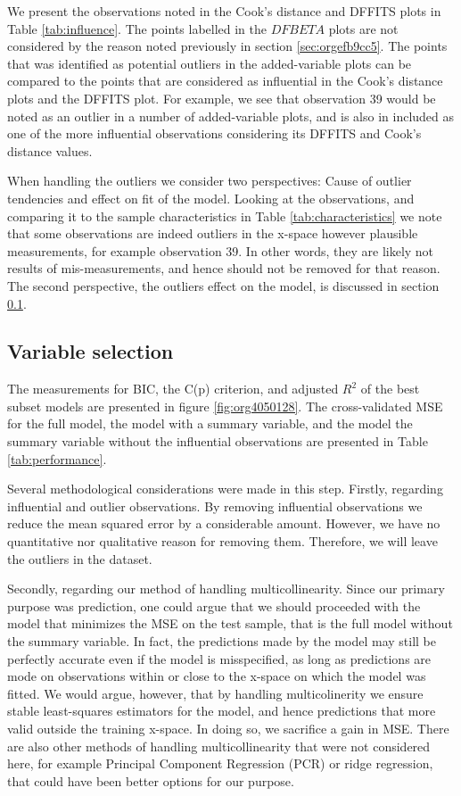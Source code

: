 \documentclass[11pt]{article}
\begin{document}
We present the observations noted in the Cook's distance and DFFITS plots in Table \ref{tab:influence}.
The points labelled in the \(DFBETA\) plots are not considered by the reason noted previously 
in section \ref{sec:orgefb9cc5}. The points that was identified as potential outliers in the added-variable
plots can be compared to the points that are considered as influential in the Cook's distance plots
and the DFFITS plot. For example, we see that observation 39 would be noted as an outlier in a number of 
added-variable plots, and is also in included as one of the more influential observations considering 
its DFFITS and Cook's distance values.

When handling the outliers we consider two perspectives: Cause of outlier tendencies and effect on fit of 
the model. Looking at the observations, and comparing it to the sample characteristics in Table \ref{tab:characteristics}
we note that some observations are indeed outliers in the x-space however 
plausible measurements, for example observation 39. In other words, they are likely not results
of mis-measurements, and hence should not be removed for that reason. The second perspective, the outliers 
effect on the model, is discussed in section \ref{sec:org2106c2e}.



\subsection{Variable selection}
\label{sec:org2106c2e}

The measurements for BIC, the C(p) criterion, and adjusted \(R^2\) of the best subset models are presented
in figure \ref{fig:org4050128}. The cross-validated MSE for the full model, the model with a summary variable, 
and the model the summary variable without the influential observations are presented in Table
\ref{tab:performance}. 

Several methodological considerations were made in this step. Firstly, regarding influential and outlier 
observations. By removing influential observations we reduce the mean squared error by a considerable amount.
However, we have no quantitative nor qualitative reason for removing them. Therefore, we will leave the 
outliers in the dataset. 

Secondly, regarding our method of handling multicollinearity. Since our primary purpose was prediction, 
one could argue that we should proceeded with the model that minimizes the MSE on the test sample, that is
the full model without the summary variable. In fact, the predictions made by the model may still be 
perfectly accurate even if the model is misspecified, as long as predictions are mode on observations within or
close to the x-space on which the model was fitted. \cite{Montgomery2012} We would argue, however, that by
handling multicolinerity we ensure stable least-squares estimators for the model, and hence predictions  
that more valid outside the training x-space. In doing so, we sacrifice a gain in MSE. 
There are also other methods of handling multicollinearity that were not considered here, for example
Principal Component Regression (PCR) or ridge regression, that could have been better 
options for our purpose.
\end{document}
